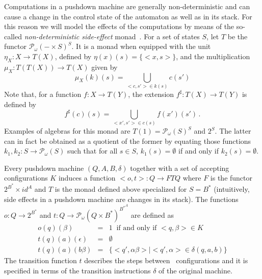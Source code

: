 \documentclass{LMCS}
\def\pow#1{{\mathcal P_\omega}#1}
\begin{document}
Computations in a pushdown machine are generally non-deterministic and can cause a change in
the control state of the automaton as well as in its stack. For this reason we will model
the effects of the computations by means of the so-called \emph{non-deterministic side-effect}
monad~\cite{BHM00}. For a set of states $S$, let $T$ be the functor $\pow(- \times S)^S$. It is a
monad when equipped with the unit $\eta_X\colon X \to T(X)$, defined by $\eta(x)(s) = \{ <x,s> \}$,
and the multiplication $\mu_X\colon T(T(X)) \to T(X)$ given by
\[
\mu_X(k)(s) = \bigcup_{<c,s'> \in k(s)} c(s')
\]
Note that, for a function $f \colon X \to T(Y)$, the extension $f^\sharp\colon T(X) \to T(Y)$ is defined by
\[
f^\sharp(c)(s) = \bigcup_{<x',s'> \in c(s)} f(x')(s') \,.
\]
Examples of algebras for this monad are $T(1) = \pow(S)^S$ and $2^S$. The latter can in fact
be obtained as a quotient of the former by equating those functions $k_1,k_2\colon S \to \pow(S)$
such that for all $s \in S$, $k_1(s) = \emptyset$ if and only if $k_2(s) = \emptyset$.

Every pushdown machine $(Q,A,B,\delta)$ together with a set of accepting configurations $K$
induces a function $<o,t>\colon Q \to FTQ$ where $F$ is  the functor $2^{B^*} \times id^A$ and
$T$ is the monad defined above specialized for $S=B^*$ (intuitively, side effects in a pushdown machine
are changes in its stack). The functions $o\colon Q \to 2^{B^*}$ and $t\colon Q \to \pow(Q\times B^{*})^{{B^*}^A}$ are defined as
\[
\begin{array}{lcl}
o(q)(\beta) &=& 1  \;\; \mbox{if and only if $<q,\beta> \in K$}
\\
t(q)(a)(\epsilon) &=&  \emptyset \\ 
t(q)(a)(b\beta) &=& \{ <q',\alpha\beta> \mid <q',\alpha> \in \delta(q,a,b) \}
\end{array}
\]
The transition function $t$ describes the steps between \pda\ configurations and it is specified in
terms of the transition instructions $\delta$ of the original machine.
\end{document}
